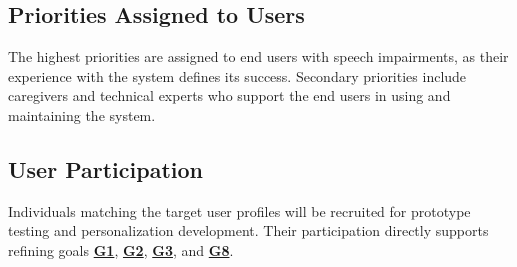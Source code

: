 \documentclass[11pt]{article}
\begin{document}
\subsection{Priorities Assigned to Users}

The highest priorities are assigned to end users with speech impairments, as their experience with the system defines its success. Secondary priorities include caregivers and technical experts who support the end users in using and maintaining the system.

\subsection{User Participation}

Individuals matching the target user profiles will be recruited for prototype testing and personalization development. Their participation directly supports refining goals \textbf{\hyperref[tab:project-goals]{G1}}, \textbf{\hyperref[tab:project-goals]{G2}}, \textbf{\hyperref[tab:project-goals]{G3}}, and \textbf{\hyperref[tab:project-goals]{G8}}.
\end{document}
